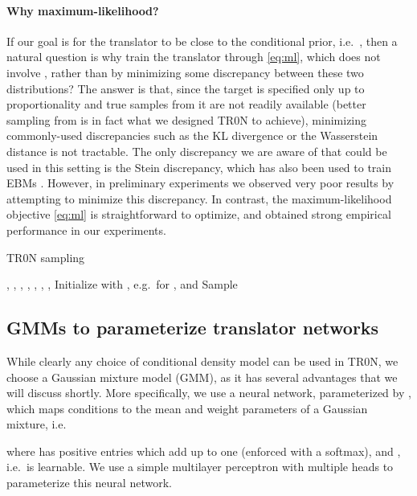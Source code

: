 \documentclass[nohyperref]{article}
\theoremstyle{plain}
\theoremstyle{definition}
\theoremstyle{remark}
\begin{document}
\paragraph{Why maximum-likelihood?} If our goal is for the translator to be close to the conditional prior, i.e.\ , then a natural question is why train the translator through \eqref{eq:ml}, which does not involve , rather than by minimizing some discrepancy between these two distributions? The answer is that, since the target  is specified only up to proportionality and true samples from it are not readily available (better sampling from  is in fact what we designed TR0N to achieve), minimizing commonly-used discrepancies such as the KL divergence or the Wasserstein distance is not tractable. The only discrepancy we are aware of that could be used in this setting is the Stein discrepancy, which has also been used to train EBMs \citep{grathwohl2020learning}. However, in preliminary experiments we observed very poor results by attempting to minimize this discrepancy. In contrast, the maximum-likelihood objective \eqref{eq:ml} is straightforward to optimize, and obtained strong empirical performance in our experiments.

\begin{algorithm}[t]
   \caption{TR0N sampling}
   \label{alg:sampling}
\begin{algorithmic}
    , , , , , , , 
   \STATE Initialize  with , e.g.\  for , and 
   \STATE Sample 
   \STATE 
   \ENDFOR
\end{algorithmic}
\end{algorithm}


\subsection{GMMs to parameterize translator networks}\label{sec:gmm}

While clearly any choice of conditional density model  can be used in TR0N, we choose a Gaussian mixture model (GMM), as it has several advantages that we will discuss shortly. More specifically, we use a neural network, parameterized by , which maps conditions  to the mean  and weight  parameters of a Gaussian mixture, i.e.\

where  has positive entries which add up to one (enforced with a softmax), and , i.e.\  is learnable. 
We use a simple multilayer perceptron with multiple heads to parameterize this neural network.
\end{document}
